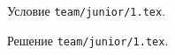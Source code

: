\problem
Условие \texttt{team/junior/1.tex}.

\solution Решение \texttt{team/junior/1.tex}.
\endproblem
